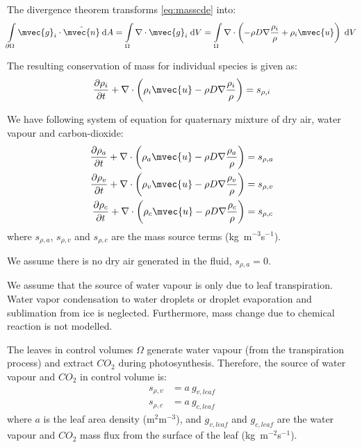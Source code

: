 The divergence theorem transforms \ref{eq:masscde} into:
\begin{equation}
\int \limits_{\partial \Omega } {{{\mvec{g}}_i}}  \cdot \hat{\mvec{n}}\:\mathrm{d}A = \int \limits_\Omega  \nabla  \cdot {{\mvec{g}}_i}\;\mathrm{d}V = \int \limits_\Omega  \nabla  \cdot \left( { - \rho D\nabla \frac{{{\rho _i}}}{{{\rho }}} + {\rho _i}{\mvec{u}}} \right)\;\mathrm{d}V
\end{equation}

The resulting conservation of mass for individual species is given as:
\begin{equation}
\frac{{\partial {\rho _i}}}{{\partial t}} + \nabla  \cdot \left( {{\rho _i}{\mvec{u}} - {\rho}{D}\nabla \frac{{{\rho _i}}}{{{\rho}}}} \right) = {s_{\rho ,i}}
\end{equation}

We have following system of equation for quaternary mixture of dry air, water vapour and carbon-dioxide:
\begin{align}
\frac{{\partial {\rho _a}}}{{\partial t}} + \nabla  \cdot \left( {{\rho _a}{\mvec{u}} - {\rho }{D}\nabla \frac{{{\rho _a}}}{{{\rho }}}} \right) &= {s_{\rho ,a}}\\
\frac{{\partial {\rho _v}}}{{\partial t}} + \nabla  \cdot \left( {{\rho _v}{\mvec{u}} - {\rho }{D}\nabla \frac{{{\rho _v}}}{{{\rho }}}} \right) &= {s_{\rho ,v}}\\
\frac{{\partial {\rho _{c}}}}{{\partial t}} + \nabla  \cdot \left( {{\rho _{c}}{\mvec{u}} - {\rho }{D}\nabla \frac{{{\rho _{c}}}}{{{\rho }}}} \right) &= {s_{\rho ,{c}}}
\end{align}
where ${s_{\rho ,a}}$, ${s_{\rho ,v}}$ and ${s_{\rho ,c}}$ are the mass source terms (kg~m$^{-3}$s$^{-1}$).

\begin{assumption}
	We assume there is no dry air generated in the fluid, ${s_{\rho ,a}} = 0$. 
\end{assumption}

\begin{assumption}
	We assume that the source of water vapour is only due to leaf transpiration. Water vapor condensation to water droplets or droplet evaporation and sublimation from ice is neglected. Furthermore, mass change due to chemical reaction is not modelled.
\end{assumption}

The leaves in control volumes $\Omega$ generate water vapour (from the transpiration process) and extract $CO_2$ during photosynthesis. Therefore, the source of water vapour and $CO_2$ in control volume is:
\begin{align}
{s_{\rho ,v}} &= a~ g_{v,leaf}\\
{s_{\rho ,c}} &= a~ g_{c,leaf}
\end{align}
where $a$ is the leaf area density (m$^2$m$^{-3}$), and $g_{v,\mathit{leaf}}$ and $g_{c,\mathit{leaf}}$ are the water vapour and $CO_2$ mass flux from the surface of the leaf (kg~m$^{-2}$s$^{-1}$).

